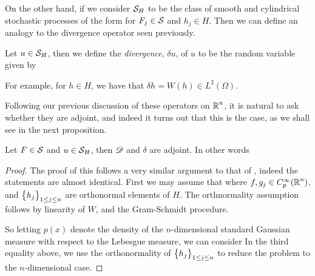 \documentclass[../main.tex]{subfiles}
\begin{document}
On the other hand, if we consider $\S_H$ to be the class of smooth and cylindrical stochastic processes of the form  for $F_j\in \S$ and $h_j\in H$. Then we can define an analogy to the divergence operator seen previously. 
\begin{definition}
\label{def:Mall_div}
Let $u\in \S_H$, then we define the \emph{divergence}, $\delta u$, of $u$ to be the random variable given by 
\end{definition}
For example, for $h\in H$, we have that $\delta h = W(h)\in L^2(\Omega)$.

Following our previous discussion of these operators on $\R^n$, it is natural to ask whether they are adjoint, and indeed it turns out that this is the case, as we shall see in the next proposition.
\begin{proposition}
\label{prop:Mall_adjoint}
Let $F\in\S$ and $u\in\S_H$, then $\Dif$ and $\delta$ are adjoint. In other words 
\end{proposition}
\begin{proof}
The proof of this follows a very similar argument to that of , indeed the statements are almost identical. First we may assume that  where $f,g_j\in C_p^\infty(\R^n)$, and $\cbr{h_j}_{1\leq j\leq n}$ are orthonormal elements of $H$. The orthnormality assumption follows by linearity of $W$, and the Gram-Schmidt procedure.

So letting $p(x)$ denote the density of the $n$-dimensional standard Gaussian measure with respect to the Lebesgue measure, we can consider  In the third equality above, we use the orthonormality of $\cbr{h_j}_{1\leq j\leq n}$ to reduce the problem to the $n$-dimensional case.
\end{proof}
\end{document}
